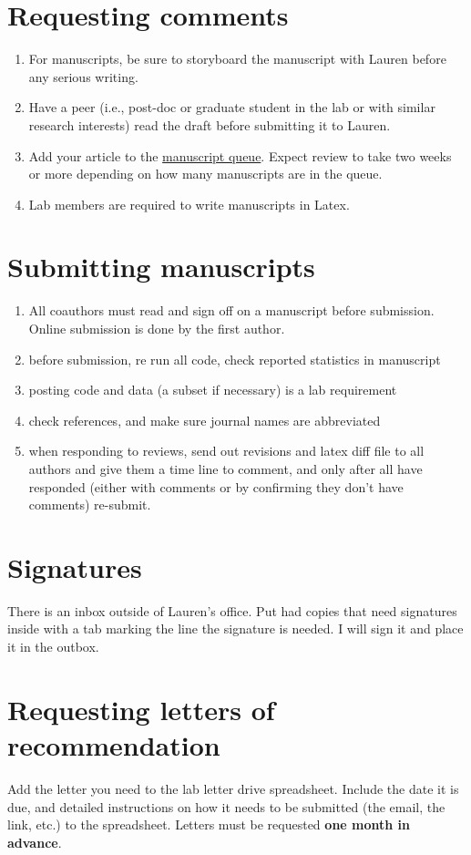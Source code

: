 \documentclass[12pt]{article}
\begin{document}
\section{Requesting comments}
\begin{enumerate}
\item For manuscripts, be sure to storyboard the manuscript with
  Lauren before any serious writing.
\item Have a peer (i.e., post-doc or graduate student in the lab or
  with similar research interests) read the draft before submitting it
  to Lauren.
\item Add your article to the
  \href{https://drive.google.com/a/ucr.edu/file/d/0B32TI_00hnPfVDJmVk5pR045Tnc/view?usp=sharing}{manuscript
    queue}. Expect review to take two weeks or more depending on how
  many manuscripts are in the queue.
\item Lab members are required to write manuscripts in Latex.
\end{enumerate}

\section{Submitting manuscripts}
\begin{enumerate}
\item All coauthors must read and sign off on a manuscript before
  submission. Online submission is done by the first author.
\item before submission, re run all code, check reported statistics in
  manuscript
\item posting code and data (a subset if necessary) is a lab
  requirement
\item check references, and make sure journal names are abbreviated
\item when responding to reviews, send out revisions and latex diff
  file to all authors and give them a time line to comment, and only
  after all have responded (either with comments or by confirming they
  don't have comments) re-submit.
\end{enumerate}

\section{Signatures}
There is an inbox outside of Lauren's office. Put had copies that need
signatures inside with a tab marking the line the signature is
needed. I will sign it and place it in the outbox.

\section{Requesting letters of recommendation}
Add the letter you need to the lab letter drive spreadsheet. Include
the date it is due, and detailed instructions on how it needs to be
submitted (the email, the link, etc.) to the spreadsheet. Letters must
be requested \textbf{one month in advance}.
\end{document}
